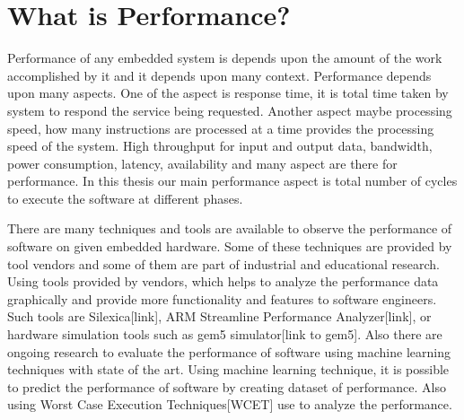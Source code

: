 \setlength{\parindent}{4em}
\setlength{\parskip}{1em}
\section{What is Performance?}
Performance of any embedded system is depends upon the amount of the work accomplished by it and it depends upon many context. Performance depends upon many aspects. One of the aspect is response time, it is total time taken by system to respond the service being requested. Another aspect maybe processing speed, how many instructions are processed at a time provides the processing speed of the system. High throughput for input and output data, bandwidth, power consumption, latency, availability and many aspect are there for performance. In this thesis our main performance aspect is total number of cycles to execute the software at different phases.  


\par There are many techniques and tools are available to observe the performance of software on given embedded hardware. Some of these techniques are provided by tool vendors and some of them are part of industrial and educational research. Using tools provided by vendors, which helps to analyze the performance data graphically and provide more functionality and features to software engineers. Such tools are Silexica[link], ARM Streamline Performance Analyzer[link], or hardware simulation tools such as gem5 simulator[link to gem5]. Also there are ongoing research to evaluate the performance of software using machine learning techniques with state of the art. Using machine learning technique, it is possible to predict the performance of software by creating dataset of performance. Also using Worst Case Execution Techniques[WCET] use to analyze the performance.

